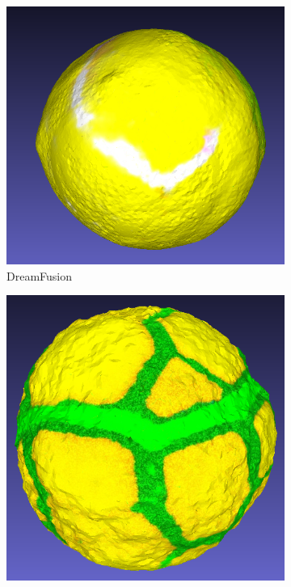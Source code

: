\begin{figure}[ht]
    \centering
    \small
    \begin{subfigure}[b]{0.22\textwidth}
        \centering
        \includegraphics[width=\textwidth]{figures/technical/dreamfusion_ball_result.png}
        \caption{DreamFusion}
    \end{subfigure}
    \begin{subfigure}[b]{0.2\textwidth}
        \centering
        \includegraphics[width=\textwidth]{figures/technical/magic3d_ball_result.png}

\end{subfigure}
\end{figure}
